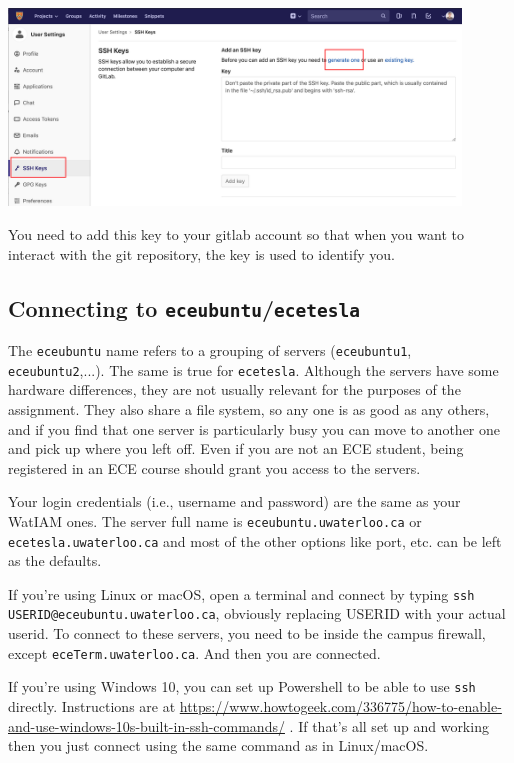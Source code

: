 \documentclass[letterpaper,10pt]{article}
\begin{document}
\begin{center}
	\includegraphics[width=0.9\textwidth]{images/gitlab-sshkey.png}
\end{center}

You need to add this key to your gitlab account so that when you want to interact with the git repository, the key is used to identify you.

\subsection*{Connecting to \texttt{eceubuntu}/\texttt{ecetesla}}

The \texttt{eceubuntu} name refers to a grouping of servers (\texttt{eceubuntu1}, \texttt{eceubuntu2},...). The same is true for \texttt{ecetesla}. Although the servers have some hardware differences, they are not usually relevant for the purposes of the assignment. They also share a file system, so any one is as good as any others, and if you find that one server is particularly busy you can move to another one and pick up where you left off. Even if you are not an ECE student, being registered in an ECE course should grant you access to the servers.

Your login credentials (i.e., username and password) are the same as your WatIAM ones. The server full name is \texttt{eceubuntu.uwaterloo.ca} or \texttt{ecetesla.uwaterloo.ca} and most of the other options like port, etc. can be left as the defaults. 

If you're using Linux or macOS, open a terminal and connect by typing \texttt{ssh USERID@eceubuntu.uwaterloo.ca}, obviously replacing USERID with your actual userid. To connect to these servers, you need to be inside the campus firewall, except \texttt{eceTerm.uwaterloo.ca}. And then you are connected. 

If you're using Windows 10, you can set up Powershell to be able to use \texttt{ssh} directly. Instructions are at \url{https://www.howtogeek.com/336775/how-to-enable-and-use-windows-10s-built-in-ssh-commands/} . If that's all set up and working then you just connect using the same command as in Linux/macOS.
\end{document}
